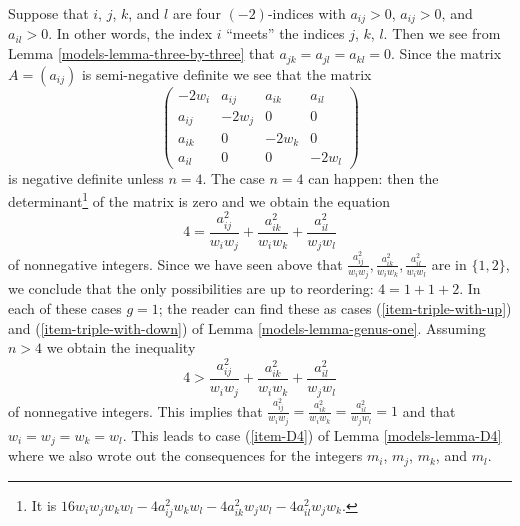 Suppose that $i$, $j$, $k$,
and $l$ are four $(-2)$-indices with $a_{ij} > 0$, $a_{ij} > 0$, and
$a_{il} > 0$. In other words, the index $i$ ``meets'' the indices
$j$, $k$, $l$. Then we see from Lemma \ref{models-lemma-three-by-three} that
$a_{jk} = a_{jl} = a_{kl} = 0$. Since the matrix $A = (a_{ij})$ is
semi-negative definite we see that the matrix
$$
\left(
\begin{matrix}
-2w_i & a_{ij} & a_{ik} & a_{il} \\
a_{ij} & -2w_j & 0 & 0 \\
a_{ik} & 0 & -2w_k & 0 \\
a_{il} & 0 & 0 & -2w_l
\end{matrix}
\right)
$$
is negative definite unless $n = 4$. The case $n = 4$ can happen:
then the determinant\footnote{It is
$16w_iw_jw_kw_l - 4a_{ij}^2w_kw_l - 4a_{ik}^2w_jw_l - 4a_{il}^2w_jw_k$.}
of the matrix is zero and we obtain the equation
$$
4 = \frac{a_{ij}^2}{w_iw_j} + \frac{a_{ik}^2}{w_iw_k} + \frac{a_{il}^2}{w_jw_l}
$$
of nonnegative integers. Since we have seen above that
$\frac{a_{ij}^2}{w_iw_j}, \frac{a_{ik}^2}{w_iw_k}, \frac{a_{il}^2}{w_iw_l}$
are in $\{1, 2\}$, we conclude that the only possibilities
are up to reordering: $4 = 1 + 1 + 2$. In each of these
cases $g = 1$; the reader can find these as cases
(\ref{item-triple-with-up}) and (\ref{item-triple-with-down}) of
Lemma \ref{models-lemma-genus-one}. Assuming $n > 4$
we obtain the inequality
$$
4 > \frac{a_{ij}^2}{w_iw_j} + \frac{a_{ik}^2}{w_iw_k} + \frac{a_{il}^2}{w_jw_l}
$$
of nonnegative integers. This implies that $\frac{a_{ij}^2}{w_iw_j} =
\frac{a_{ik}^2}{w_iw_k} = \frac{a_{il}^2}{w_jw_l} = 1$
and that $w_i = w_j = w_k = w_l$. This leads to case
(\ref{item-D4}) of Lemma \ref{models-lemma-D4}
where we also wrote out the consequences for the integers $m_i$, $m_j$, $m_k$,
and $m_l$.

